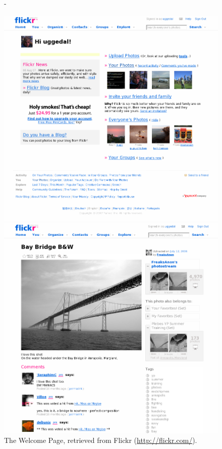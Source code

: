 \begin{figure}
  \centering
  \strictpagechecktrue
  \begin{adjustwidth*}{0em}{-\wholemargin}
    \begin{minipage}[t]{0.475\wholewidth}
      \includegraphics[width=1\textwidth]{scrsh_flickr_welcome}
      \caption[Flickr Welcome Page]{%
         The Welcome Page,
         retrieved from Flickr (\url{http://flickr.com/}).}
      \label{figure:scrsh.flickr.welcome}
    \end{minipage}
    \hfill
    \begin{minipage}[t]{0.475\wholewidth}
      \includegraphics[width=1\textwidth]{scrsh_flickr_photo_detail}

\end{minipage}
\end{adjustwidth*}
\end{figure}
